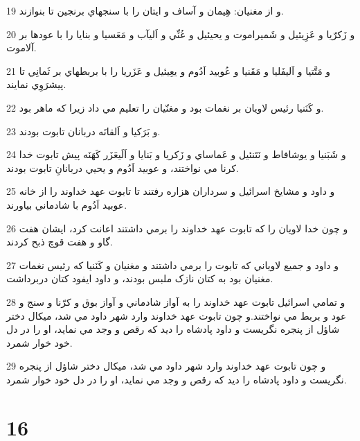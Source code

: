 \par 19 و از مغنيان: هِيمان و آساف و ايتان را با سنجهاي برنجين تا بنوازند.
\par 20 و زَکرّيا و عَزِيئيل و شَميراموت و يحيئيل و عُنِّي و اَليآب و مَعَسيا و بنايا را با عودها بر آلاموت.
\par 21 و مَتَّتيا و اَليفَليا و مَقَنيا و عُوبيد اَدُوم و يعِيئيل و عَزَريا را با بربطهاي بر ثَمانِي تا پيشرَوِي نمايند.
\par 22 و کَنَنيا رئيس لاويان بر نغمات بود و مغنّيان را تعليم مي داد زيرا که ماهر بود.
\par 23 و بَرَکيا و اَلقانَه دربانان تابوت بودند.
\par 24 و شَبَنيا و يوشافاط و نَتَنئيل و عَماساي و زَکريا و بَنايا و اَلَيعَزَر کَهَنَه پيش تابوت خدا کرنا مي نواختند، و عوبيد اَدُوم و يحيي دربانانِ تابوت بودند.
\par 25 و داود و مشايخ اسرائيل و سرداران هزاره رفتند تا تابوت عهد خداوند را از خانه عوبيد اَدُوم با شادماني بياورند.
\par 26 و چون خدا لاويان را که تابوت عهد خداوند را برمي داشتند اعانت کرد، ايشان هفت گاو و هفت قوچ ذبح کردند.
\par 27 و داود و جميع لاوياني که تابوت را برمي داشتند و مغنيان و کَنَنيا که رئيس نغمات مغنيان بود به کتان نازک ملبس بودند، و داود ايفود کتان دربرداشت.
\par 28 و تمامي اسرائيل تابوت عهد خداوند را به آواز شادماني و آواز بوق و کرّنا و سنج و عود و بربط مي نواختند.و چون تابوت عهد خداوند وارد شهر داود مي شد، ميکال دختر شاؤل از پنجره نگريست و داود پادشاه را ديد که رقص و وجد مي نمايد، او را در دل خود خوار شمرد.
\par 29 و چون تابوت عهد خداوند وارد شهر داود مي شد، ميکال دختر شاؤل از پنجره نگريست و داود پادشاه را ديد که رقص و وجد مي نمايد، او را در دل خود خوار شمرد.
 
\chapter{16}


